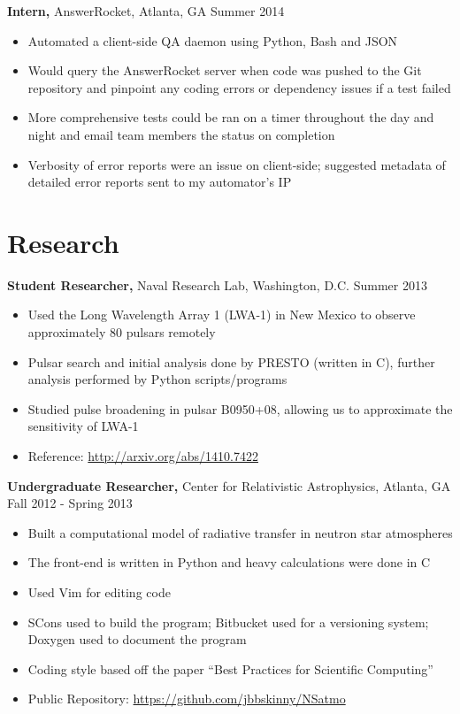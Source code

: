 \documentclass[margin]{res}
\begin{document}
\begin{resume}
 {\bf Intern,} AnswerRocket, Atlanta, GA \hfill Summer 2014
 \begin{itemize} \itemsep -2pt  %
 \item Automated a client-side QA daemon using Python, Bash and JSON
 \item Would query the AnswerRocket server when code was pushed to the Git repository
       and pinpoint any coding errors or dependency issues if a test failed
 \item More comprehensive tests could be ran on a timer throughout the day and night
       and email team members the status on completion
 \item Verbosity of error reports were an issue on client-side; suggested
       metadata of detailed error reports sent to my automator's IP
 \end{itemize}


\section{Research}
 {\bf Student Researcher,} Naval Research Lab, Washington, D.C. \hfill Summer  2013
 \begin{itemize} \itemsep -2pt  %
 \item Used the Long Wavelength Array 1 (LWA-1) in New Mexico to observe 
       approximately 80 pulsars remotely
 \item Pulsar search and initial analysis done by PRESTO (written in C),
       further analysis performed by Python scripts/programs
 \item Studied pulse broadening in pulsar B0950+08, allowing us to approximate 
       the sensitivity of LWA-1
 \item Reference: \url{http://arxiv.org/abs/1410.7422}
 \end{itemize}

 {\bf Undergraduate Researcher,} Center for Relativistic Astrophysics, Atlanta, GA \\  
                                                              Fall 2012 - Spring 2013
 \begin{itemize} \itemsep -2pt %
 \item Built a computational model of radiative transfer in neutron star atmospheres 
 \item The front-end is written in Python and heavy calculations were done in C
 \item Used Vim for editing code
 \item SCons used to build the program; Bitbucket used for a versioning system; 
       Doxygen used to document the program
 \item Coding style based off the paper ``Best Practices for Scientific Computing''
 \item Public Repository: \url{https://github.com/jbbskinny/NSatmo}
 \end{itemize}


\end{resume}
\end{document}
